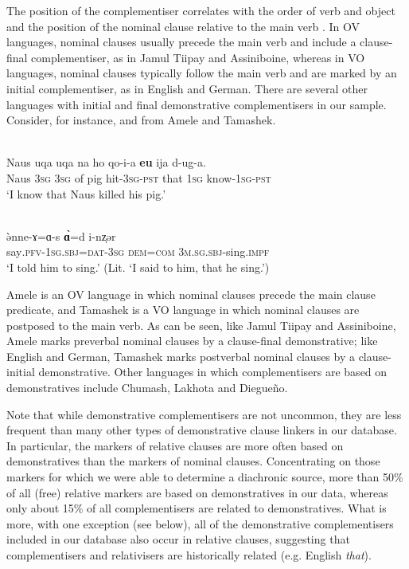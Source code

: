 \documentclass[output=paper,colorlinks,citecolor=brown]{langscibook}
\begin{document}
The position of the complementiser correlates with the order of verb and object and the position of the nominal clause relative to the main verb \citep{SchmidtkeBodeDiessel2017}. In OV languages, nominal clauses usually precede the main verb and include a clause-final complementiser, as in Jamul Tiipay and Assiniboine, whereas in VO languages, nominal clauses typically follow the main verb and are marked by an initial complementiser, as in English and German. There are several other languages with initial and final demonstrative complementisers in our sample. Consider, for instance,  and  from Amele and Tamashek.

\ea\label{ex:diessel:20}
\\
\gll {\ob}Naus uqa   uqa   na   ho qo-i-a   \textbf{eu}{\cb}   ija d-ug-a.\\
      {\db}Naus \textsc{3sg}   \textsc{3sg}   of   pig hit\textsc{-3sg-pst} that   \textsc{1sg} know\textsc{-1sg-pst}\\
\glt ‘I know that Naus killed his pig.’
\z

\ea\label{ex:diessel:21}
\\
\gll \`ənne-ɤ=ɑ-s      {\ob}\textbf{\`ɑ}=d    i-nz̩ər{\cb}\\
     say\textsc{.pfv-1sg.sbj=dat-3sg}  {\db}\textsc{dem=com}  \textsc{3m.sg.sbj-}sing\textsc{.impf}\\
\glt ‘I told him to sing.’ (Lit. ‘I said to him, that he sing.’)
\z

Amele is an OV language in which nominal clauses precede the main clause predicate, and Tamashek is a VO language in which nominal clauses are postposed to the main verb. As can be seen, like Jamul Tiipay and Assiniboine, Amele marks preverbal nominal clauses by a clause-final demonstrative; like English and German, Tamashek marks postverbal nominal clauses by a clause-initial demonstrative. Other languages in which complementisers are based on demonstratives include Chumash, Lakhota and Diegueño. 

Note that while demonstrative complementisers are not uncommon, they are less frequent than many other types of demonstrative clause linkers in our database. In particular, the markers of relative clauses are more often based on demonstratives than the markers of nominal clauses. Concentrating on those markers for which we were able to determine a diachronic source, more than 50\% of all (free) relative markers are based on demonstratives in our data, whereas only about 15\% of all complementisers are related to demonstratives. What is more, with one exception (see below), all of the demonstrative complementisers included in our database also occur in relative clauses, suggesting that complementisers and relativisers are historically related (e.g. English \textit{that}). 
\end{document}
